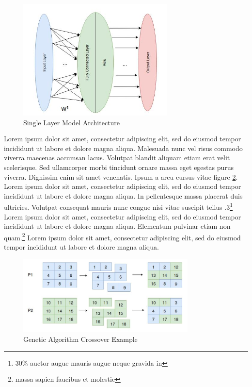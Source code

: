 \documentclass{cup-ino}
\begin{document}
\begin{figure}[h!]
\centering
\includegraphics[width=0.7\textwidth]{images/single_layer.jpeg}
\caption{Single Layer Model Architecture}
\label{fig:gen_single_layer}
\end{figure}

Lorem ipsum dolor sit amet, consectetur adipiscing elit, sed do eiusmod tempor incididunt ut labore et dolore magna aliqua. Malesuada nunc vel risus commodo viverra maecenas accumsan lacus. Volutpat blandit aliquam etiam erat velit scelerisque. Sed ullamcorper morbi tincidunt ornare massa eget egestas purus viverra. Dignissim enim sit amet venenatis. Ipsum a arcu cursus vitae figure \ref{fig:crossover}. Lorem ipsum dolor sit amet, consectetur adipiscing elit, sed do eiusmod tempor incididunt ut labore et dolore magna aliqua. In pellentesque massa placerat duis ultricies. Volutpat consequat mauris nunc congue nisi vitae suscipit tellus .3\footnote{30\% auctor augue mauris augue neque gravida in} Lorem ipsum dolor sit amet, consectetur adipiscing elit, sed do eiusmod tempor incididunt ut labore et dolore magna aliqua. Elementum pulvinar etiam non quam.\footnote{massa sapien faucibus et molestie} Lorem ipsum dolor sit amet, consectetur adipiscing elit, sed do eiusmod tempor incididunt ut labore et dolore magna aliqua.

\begin{figure}[h!]
\centering
\includegraphics[width=0.8\textwidth]{images/crossover.jpeg}
\caption{Genetic Algorithm Crossover Example}
\label{fig:crossover}
\end{figure}
\end{document}

